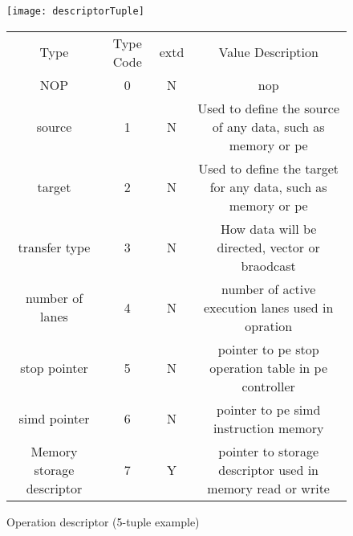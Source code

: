 \begin{figure}[!t]
  \centering
  \captionsetup{justification=centering}

  \begin{minipage}{1\textwidth}
    \centering
    \begin{minipage}{0.85\textwidth}
      \centering
      \captionsetup{justification=centering}
      \captionsetup{width=.9\linewidth}
      \centerline{
      \mbox{\texttt{[image: descriptorTuple]}}
      }
      \vspace{-2mm}
      \caption{Operation descriptor (5-tuple example)}
      \label{fig:descriptorTuple}
    \end{minipage}
    \begin{minipage}{0.85\textwidth}
        \vspace{5mm}
        \begin{adjustbox}{width=1\textwidth}
            \footnotesize
            \begin{tabular}{ |c|c|c|c|  }
              \hline
              \rowcolor{gray!50}
              \multicolumn{4}{|c|}{Source} \\
              \hline
              \rowcolor{gray!25}
              Type & Type Code & extd &  Value Description  \\
              \hline
              NOP                              &    0   &  N&  \acl{nop} \\
              source                           &    1   &  N&  Used to define the source of any data, such as memory or \ac{pe}  \\
              target                           &    2   &  N&  Used to define the target for any data, such as memory or \ac{pe}  \\
              transfer type                    &    3   &  N&  How data will be directed, vector or braodcast                    \\
              number of lanes                  &    4   &  N&  number of active execution lanes used in opration \\
              \ac{stop} pointer                &    5   &  N&  pointer to \ac{pe} \ac{stop} operation table in \ac{pe} controller \\
              \ac{simd} pointer                &    6   &  N&  pointer to \ac{pe} \ac{simd} instruction memory  \\
              Memory storage descriptor        &    7   &  Y&  pointer to storage descriptor used in memory read or write \\

\end{tabular}
\end{adjustbox}
\end{minipage}
\end{minipage}
\end{figure}

